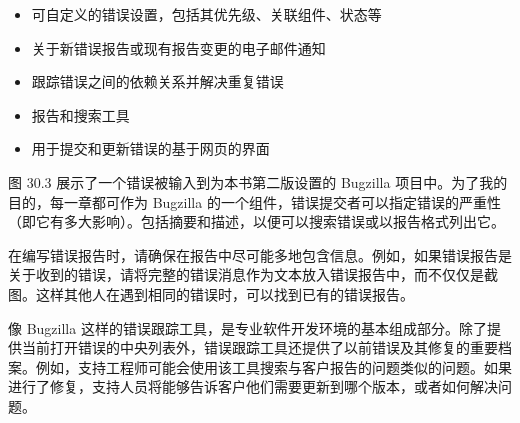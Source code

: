 \begin{itemize}
\item
可自定义的错误设置，包括其优先级、关联组件、状态等

\item
关于新错误报告或现有报告变更的电子邮件通知

\item
跟踪错误之间的依赖关系并解决重复错误

\item
报告和搜索工具

\item
用于提交和更新错误的基于网页的界面
\end{itemize}

图 30.3 展示了一个错误被输入到为本书第二版设置的 Bugzilla 项目中。为了我的目的，每一章都可作为 Bugzilla 的一个组件，错误提交者可以指定错误的严重性（即它有多大影响）。包括摘要和描述，以便可以搜索错误或以报告格式列出它。


在编写错误报告时，请确保在报告中尽可能多地包含信息。例如，如果错误报告是关于收到的错误，请将完整的错误消息作为文本放入错误报告中，而不仅仅是截图。这样其他人在遇到相同的错误时，可以找到已有的错误报告。

像 Bugzilla 这样的错误跟踪工具，是专业软件开发环境的基本组成部分。除了提供当前打开错误的中央列表外，错误跟踪工具还提供了以前错误及其修复的重要档案。例如，支持工程师可能会使用该工具搜索与客户报告的问题类似的问题。如果进行了修复，支持人员将能够告诉客户他们需要更新到哪个版本，或者如何解决问题。















